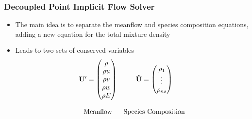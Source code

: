 \documentclass{beamer}
\begin{document}
\begin{frame}
  \frametitle{Decoupled Point Implicit Flow Solver}
  \begin{itemize}
    \item The main idea is to separate the meanflow and species composition
      equations, adding a new equation for the total mixture density
    \item Leads to two sets of conserved variables
      \begin{equation*}
      	\begin{matrix}
      		\mathbf U'=\begin{pmatrix}
      			\rho \\
      			\rho u \\
      			\rho v \\
      			\rho w \\
      			\rho E
      		\end{pmatrix} &
      		\mathbf{\hat{U}}=\begin{pmatrix}
      			\rho_1 \\
      			\vdots \\
      			\rho_{ns}
      		\end{pmatrix} \\ \\
          \text{Meanflow} & \text{Species Composition}
      	\end{matrix} 
      \end{equation*}
  \end{itemize}
\end{frame}
\end{document}
